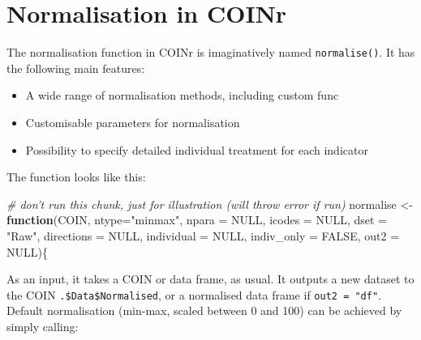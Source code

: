\documentclass[
]{book}
\newenvironment{Shaded}{\begin{snugshade}}{\end{snugshade}}
\newcommand{\CommentTok}[1]{\textcolor[rgb]{0.56,0.35,0.01}{\textit{#1}}}
\newcommand{\ControlFlowTok}[1]{\textcolor[rgb]{0.13,0.29,0.53}{\textbf{#1}}}
\newcommand{\DataTypeTok}[1]{\textcolor[rgb]{0.13,0.29,0.53}{#1}}
\newcommand{\NormalTok}[1]{#1}
\newcommand{\OtherTok}[1]{\textcolor[rgb]{0.56,0.35,0.01}{#1}}
\newcommand{\StringTok}[1]{\textcolor[rgb]{0.31,0.60,0.02}{#1}}
\providecommand{\tightlist}{%
  \setlength{\itemsep}{0pt}\setlength{\parskip}{0pt}}
\begin{document}
\hypertarget{normalisation-in-coinr}{%
\section{Normalisation in COINr}\label{normalisation-in-coinr}}

The normalisation function in COINr is imaginatively named \texttt{normalise()}. It has the following main features:

\begin{itemize}
\tightlist
\item
  A wide range of normalisation methods, including custom func
\item
  Customisable parameters for normalisation
\item
  Possibility to specify detailed individual treatment for each indicator
\end{itemize}

The function looks like this:

\begin{Shaded}
\begin{Highlighting}[]
\CommentTok{# don't run this chunk, just for illustration (will throw error if run)}
\NormalTok{normalise <-}\StringTok{ }\ControlFlowTok{function}\NormalTok{(COIN, }\DataTypeTok{ntype=}\StringTok{"minmax"}\NormalTok{, }\DataTypeTok{npara =} \OtherTok{NULL}\NormalTok{, }\DataTypeTok{icodes =} \OtherTok{NULL}\NormalTok{,}
                      \DataTypeTok{dset =} \StringTok{"Raw"}\NormalTok{, }\DataTypeTok{directions =} \OtherTok{NULL}\NormalTok{, }\DataTypeTok{individual =} \OtherTok{NULL}\NormalTok{,}
                      \DataTypeTok{indiv_only =} \OtherTok{FALSE}\NormalTok{, }\DataTypeTok{out2 =} \OtherTok{NULL}\NormalTok{)\{}
\end{Highlighting}
\end{Shaded}

As an input, it takes a COIN or data frame, as usual. It outputs a new dataset to the COIN \texttt{.\$Data\$Normalised}, or a normalised data frame if \texttt{out2\ =\ "df"}. Default normalisation (min-max, scaled between 0 and 100) can be achieved by simply calling:
\end{document}
